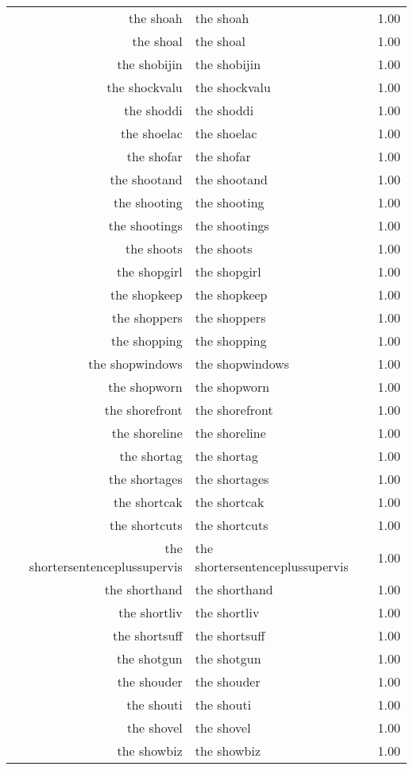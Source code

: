\begin{table}[ht]
\begin{tabular}{rlr}
  the shoah & the shoah & 1.00 \\ 
  the shoal & the shoal & 1.00 \\ 
  the shobijin & the shobijin & 1.00 \\ 
  the shockvalu & the shockvalu & 1.00 \\ 
  the shoddi & the shoddi & 1.00 \\ 
  the shoelac & the shoelac & 1.00 \\ 
  the shofar & the shofar & 1.00 \\ 
  the shootand & the shootand & 1.00 \\ 
  the shooting & the shooting & 1.00 \\ 
  the shootings & the shootings & 1.00 \\ 
  the shoots & the shoots & 1.00 \\ 
  the shopgirl & the shopgirl & 1.00 \\ 
  the shopkeep & the shopkeep & 1.00 \\ 
  the shoppers & the shoppers & 1.00 \\ 
  the shopping & the shopping & 1.00 \\ 
  the shopwindows & the shopwindows & 1.00 \\ 
  the shopworn & the shopworn & 1.00 \\ 
  the shorefront & the shorefront & 1.00 \\ 
  the shoreline & the shoreline & 1.00 \\ 
  the shortag & the shortag & 1.00 \\ 
  the shortages & the shortages & 1.00 \\ 
  the shortcak & the shortcak & 1.00 \\ 
  the shortcuts & the shortcuts & 1.00 \\ 
  the shortersentenceplussupervis & the shortersentenceplussupervis & 1.00 \\ 
  the shorthand & the shorthand & 1.00 \\ 
  the shortliv & the shortliv & 1.00 \\ 
  the shortsuff & the shortsuff & 1.00 \\ 
  the shotgun & the shotgun & 1.00 \\ 
  the shouder & the shouder & 1.00 \\ 
  the shouti & the shouti & 1.00 \\ 
  the shovel & the shovel & 1.00 \\ 
  the showbiz & the showbiz & 1.00 \\ 

\end{tabular}
\end{table}
